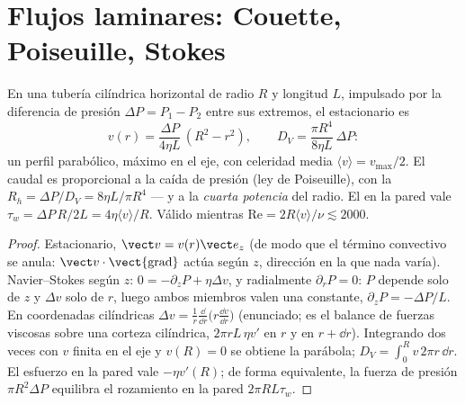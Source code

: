 \section{Flujos laminares: Couette, Poiseuille, Stokes}

\begin{proposition}\label{prop:b2:viscous-flows:poiseuille}
En una tubería cilíndrica horizontal de radio $R$ y longitud $L$, impulsado
por la diferencia de presión $\Delta P = P_1 - P_2$ entre sus extremos, el
 estacionario es
\[
v(r) = \frac{\Delta P}{4\eta L}\,(R^2 - r^2) , \qquad
D_V = \frac{\pi R^4}{8\eta L}\,\Delta P :
\]
un perfil parabólico, máximo en el eje, con celeridad media
$\langle v\rangle = v_{\max}/2$. El caudal es proporcional a la caída de
presión (ley de Poiseuille), con la \emph{}
$R_h = \Delta P/D_V = 8\eta L/\pi R^4$ --- y a la \emph{cuarta potencia} del
radio. El  en la pared vale $\tau_w = \Delta P\,R/2L = 4\eta\langle v
\rangle/R$. Válido mientras $\mathrm{Re} = 2R\langle v\rangle/\nu \lesssim 2000$.
\end{proposition}

\begin{proof}
Estacionario, $\vect v = v(r)\vect e_z$ (de modo que el término convectivo se anula: $\vect v
\cdot\operatorname{\vect{grad}}$ actúa según $z$, dirección en la que nada
varía). Navier--Stokes según $z$: $0 = -\partial_zP + \eta\Delta v$, y
radialmente $\partial_rP = 0$: $P$ depende solo de $z$ y $\Delta v$ solo de $r$, luego
ambos miembros valen una constante, $\partial_zP = -\Delta P/L$. En coordenadas
cilíndricas $\Delta v = \frac1r\frac{\dd}{\dd r}\bigl(r\frac{\dd v}{\dd r}\bigr)$
(enunciado; es el balance de fuerzas viscosas sobre una corteza cilíndrica,
$2\pi rL\,\eta v'$ en $r$ y en $r + \dd r$). Integrando dos veces con $v$
finita en el eje y $v(R) = 0$ se obtiene la parábola; $D_V = \int_0^Rv\,2\pi
r\,\dd r$. El esfuerzo en la pared vale $-\eta v'(R)$; de forma equivalente, la fuerza
de presión $\pi R^2\Delta P$ equilibra el rozamiento en la pared $2\pi RL\tau_w$.
\end{proof}


